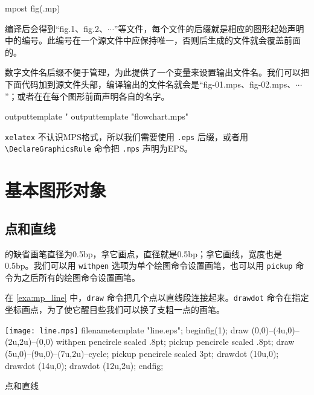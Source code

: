 \begin{Code}[]
mpost fig(.mp)
\end{Code}

编译后会得到“fig.1、fig.2、$\cdots$”等文件，每个文件的后缀就是相应的图形起始声明中的编号。此编号在一个源文件中应保持唯一，否则后生成的文件就会覆盖前面的。

数字文件名后缀不便于管理，\MP 为此提供了一个变量来设置输出文件名。我们可以把下面代码加到源文件头部，编译输出的文件名就会是“fig-01.mps、fig-02.mps、$\cdots$”；或者在在每个图形前面声明各自的名字。

\begin{Code}[]
outputtemplate "%
outputtemplate "flowchart.mps" %
\end{Code}

\texttt{xelatex} 不认识MPS格式，所以我们需要使用 \texttt{.eps} 后缀，或者用 \verb|\DeclareGraphicsRule| 命令把 \texttt{.mps} 声明为EPS。

\begin{Code}[]
\end{Code}

\section{基本图形对象}

\subsection{点和直线}

\MP 的缺省画笔直径为0.5bp，拿它画点，直径就是0.5bp；拿它画线，宽度也是0.5bp。我们可以用 \texttt{withpen} 选项为单个绘图命令设置画笔，也可以用 \texttt{pickup} 命令为之后所有的绘图命令设置画笔。

在 \autoref{exa:mp_line} 中，\texttt{draw} 命令把几个点以直线段连接起来。\texttt{drawdot} 命令在指定坐标画点，为了使它醒目些我们可以换了支粗一点的画笔。

\begin{example}[h]
\begin{FBTDemo}[numbers=left]{\texttt{[image: line.mps]}}
filenametemplate "line.eps";
beginfig(1);
draw (0,0)--(4u,0)--(2u,2u)--(0,0) withpen pencircle scaled .8pt;
pickup pencircle scaled .8pt;
draw (5u,0)--(9u,0)--(7u,2u)--cycle;
pickup pencircle scaled 3pt;
drawdot (10u,0);
drawdot (14u,0);
drawdot (12u,2u);
endfig;
\end{FBTDemo}
\caption{\MP 点和直线}
\label{exa:mp_line}
\end{example}

